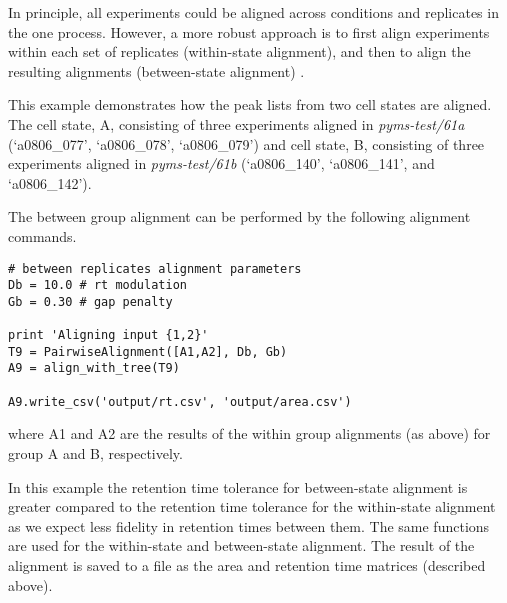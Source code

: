 In principle, all experiments could be aligned across conditions and
replicates in the one process. However, a more robust approach is to first align
experiments within each set of replicates (within-state
alignment), and then to align the resulting alignments (between-state
alignment) \cite{Robinson07}.

This example demonstrates how the peak lists from two cell states are
aligned. The cell state, A, consisting of three experiments aligned in {\em
pyms-test/61a} (`a0806\_077', `a0806\_078', `a0806\_079') and cell state,
B, consisting of three experiments aligned in {\em pyms-test/61b} (`a0806\_140',
`a0806\_141', and `a0806\_142').

The between group alignment can be performed by the following alignment
commands.

\begin{verbatim}
# between replicates alignment parameters
Db = 10.0 # rt modulation
Gb = 0.30 # gap penalty

print 'Aligning input {1,2}'
T9 = PairwiseAlignment([A1,A2], Db, Gb)
A9 = align_with_tree(T9)

A9.write_csv('output/rt.csv', 'output/area.csv')
\end{verbatim}

\noindent
where A1 and A2 are the results of the within group alignments (as above) for
group A and B, respectively.

In this example the retention time tolerance for between-state alignment is
greater compared to the retention time tolerance for the within-state alignment
as we expect less fidelity in retention times between them.  The same functions
are used for the within-state and between-state alignment. The result of the
alignment is saved to a file as the area and retention time matrices (described
above).

%
